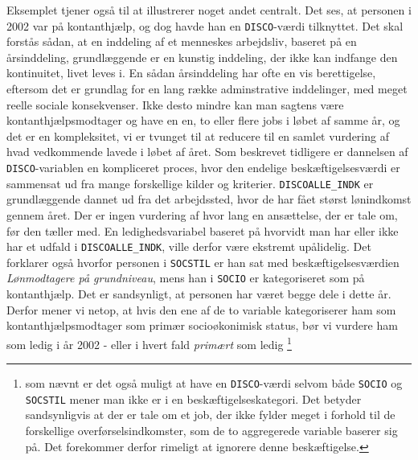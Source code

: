 Eksemplet tjener også til at illustrerer noget andet centralt. Det ses, at personen i 2002 var på kontanthjælp, og dog havde han en \texttt{DISCO}-værdi tilknyttet. Det skal forstås sådan, at en inddeling af et menneskes arbejdsliv, baseret på en årsinddeling, grundlæggende er en kunstig inddeling, der ikke kan indfange den kontinuitet, livet leves i. En sådan årsinddeling har ofte en vis berettigelse, eftersom det er grundlag for en lang række adminstrative inddelinger, med meget reelle sociale konsekvenser. Ikke desto mindre kan man sagtens være kontanthjælpsmodtager og have en en, to eller flere jobs i løbet af samme år, og det er en kompleksitet, vi er tvunget til at reducere til en samlet vurdering af hvad vedkommende lavede i løbet af året. Som beskrevet tidligere er dannelsen af \texttt{DISCO}-variablen en kompliceret proces, hvor den endelige beskæftigelsesværdi er sammensat ud fra mange forskellige kilder og kriterier. \texttt{DISCOALLE\_INDK} er grundlæggende dannet ud fra det arbejdssted, hvor de har fået størst lønindkomst gennem året. Der er ingen vurdering af hvor lang en ansættelse, der er tale om, før den tæller med. En ledighedsvariabel baseret på hvorvidt man har eller ikke har et udfald i \texttt{DISCOALLE\_INDK}, ville derfor være ekstremt upålidelig. Det forklarer også hvorfor personen i \texttt{SOCSTIL} er han sat med beskæftigelsesværdien \emph{Lønmodtagere på grundniveau}, mens han i \texttt{SOCIO} er kategoriseret som på kontanthjælp. Det er sandsynligt, at personen har været begge dele i dette år. Derfor mener vi netop, at hvis den ene af de to variable kategoriserer ham som kontanthjælpsmodtager som primær socioøkonimisk status, bør vi vurdere ham som ledig i år 2002 - eller i hvert fald \emph{primært} som ledig \footnote{som nævnt er det også muligt at have en \texttt{DISCO}-værdi selvom både \texttt{SOCIO} og \texttt{SOCSTIL} mener man ikke er i en beskæftigelseskategori. Det betyder sandsynligvis at der er tale om et job, der ikke fylder meget i forhold til de forskellige overførselsindkomster, som de to aggregerede variable baserer sig på. Det forekommer derfor rimeligt at ignorere denne beskæftigelse.}
